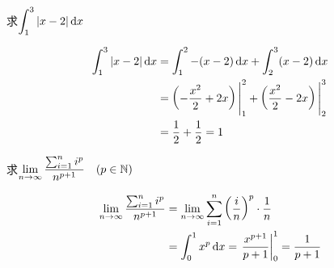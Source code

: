 \begin{example}
    求$\displaystyle\int^3_1 |x-2|\,{\rm d} x$
\end{example}

\begin{solution}
\[\begin{split}
    \displaystyle\int^3_1 |x-2|\,{\rm d} x&=\displaystyle\int^2_1 -(x-2)\,{\rm d} x+\displaystyle\int^3_2 (x-2)\,{\rm d} x\\
&=\left(-\dfrac{x^2}{2}+2x\right)\Bigg|^2_1+\left(\dfrac{x^2}{2}-2x\right)\Bigg|^3_2\\
&=\dfrac{1}{2}+\dfrac{1}{2}=1
\end{split}\]
\end{solution}

\begin{example}
求$\displaystyle\lim_{n\to\infty}\dfrac{\sum^n_{i=1}i^p}{n^{p+1}}\quad (p\in \mathbb{N})$
\end{example}


\begin{solution}
\[\begin{split}
    \displaystyle\lim_{n\to\infty}\dfrac{\sum^n_{i=1}i^p}{n^{p+1}}&=\displaystyle\lim_{n\to\infty}\sum^n_{i=1}\left(\dfrac{i}{n}\right)^p\cdot \dfrac{1}{n}\\
    &=\int^1_0 x^p\,{\rm d} x=\left.\dfrac{x^{p+1}}{p+1}\right|^1_0=\dfrac{1}{p+1}
\end{split}\]
\end{solution}

